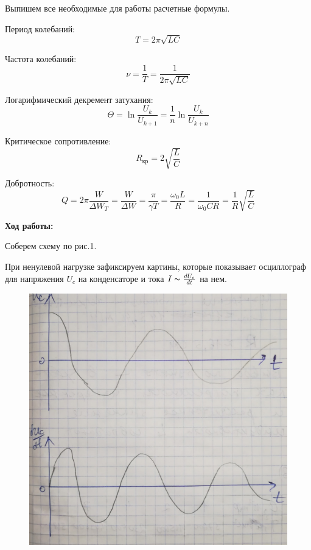 \documentclass[a4paper,12pt]{article} %
\begin{document}
Выпишем все необходимые для работы расчетные формулы.

Период колебаний:
\begin{equation}
	T = 2\pi\sqrt{LC}
\end{equation}

Частота колебаний:
\begin{equation}
	\nu = \frac{1}{T} = \frac{1}{2\pi\sqrt{LC}}
\end{equation}

Логарифмический декремент затухания:
\begin{equation}
	\Theta = \ln{\frac{U_{k}}{U_{k+1}}} = \frac{1}{n}\ln{\frac{U_{k}}{U_{k+n}}}
\end{equation}

Критическое сопротивление:
\begin{equation}
	R_{\text{кр}} = 2\sqrt{\frac{L}{C}}
\end{equation}

Добротность:
\begin{equation}
	Q = 2\pi\frac{W}{\Delta W_{T}} = \frac{W}{\Delta W} = \frac{\pi}{\gamma T} = \frac{\omega_{0}L}{R} = \frac{1}{\omega_{0}CR} = \frac{1}{R}\sqrt{\frac{L}{C}}
\end{equation}


\newpage

\textbf{Ход работы:}

Соберем схему по рис.1.

При ненулевой нагрузке зафиксируем картины, которые показывает осциллограф для напряжения $U_c$ на конденсаторе и тока $I \thicksim \frac{dU_c}{dt}$ на нем.

\begin{figure}[h!]
	\centering
	\includegraphics[scale=0.287]{Конд.jpg}
\end{figure}
\end{document}
